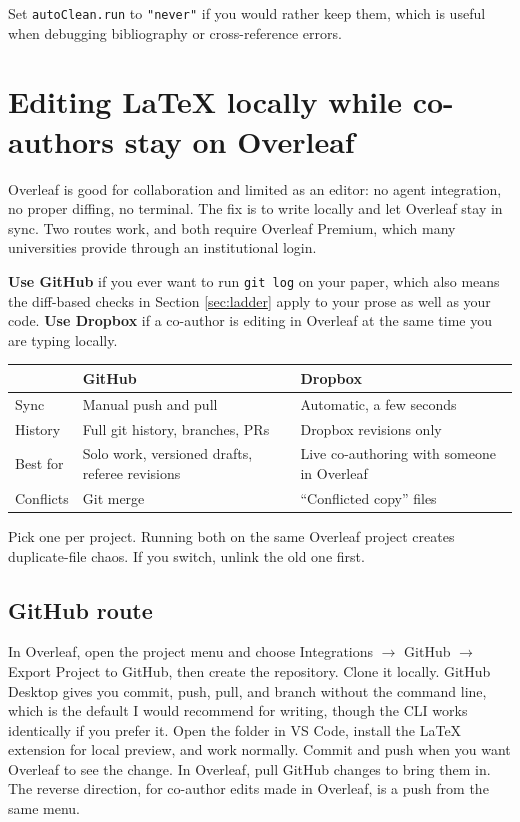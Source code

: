 \documentclass[11pt,a4paper]{article}
\newcommand{\code}[1]{\texttt{\small #1}}
\begin{document}
Set \code{autoClean.run} to \code{"never"} if you would rather keep them, which is
useful when debugging bibliography or cross-reference errors.

\clearpage
\section{Editing LaTeX locally while co-authors stay on Overleaf}
\label{app:overleaf}

Overleaf is good for collaboration and limited as an editor: no agent
integration, no proper diffing, no terminal. The fix is to write locally and let
Overleaf stay in sync. Two routes work, and both require Overleaf Premium, which
many universities provide through an institutional login.

\textbf{Use GitHub} if you ever want to run \code{git log} on your paper, which
also means the diff-based checks in Section \ref{sec:ladder} apply to your prose
as well as your code. \textbf{Use Dropbox} if a co-author is editing in Overleaf at
the same time you are typing locally.

\begin{longtable}{@{}p{2.4cm}p{5.2cm}p{5.2cm}@{}}
\toprule
& \textbf{GitHub} & \textbf{Dropbox} \\
\midrule
\endhead
Sync & Manual push and pull & Automatic, a few seconds \\
History & Full git history, branches, PRs & Dropbox revisions only \\
Best for & Solo work, versioned drafts, referee revisions & Live co-authoring with
someone in Overleaf \\
Conflicts & Git merge & ``Conflicted copy'' files \\
\bottomrule
\end{longtable}

Pick one per project. Running both on the same Overleaf project creates
duplicate-file chaos. If you switch, unlink the old one first.

\subsection{GitHub route}

In Overleaf, open the project menu and choose Integrations $\rightarrow$ GitHub
$\rightarrow$ Export Project to GitHub, then create the repository. Clone it
locally. GitHub Desktop gives you commit, push, pull, and branch without the
command line, which is the default I would recommend for writing, though the CLI
works identically if you prefer it. Open the folder in VS Code, install the LaTeX
extension for local preview, and work normally. Commit and push when you want
Overleaf to see the change. In Overleaf, pull GitHub changes to bring them in.
The reverse direction, for co-author edits made in Overleaf, is a push from the
same menu.
\end{document}
